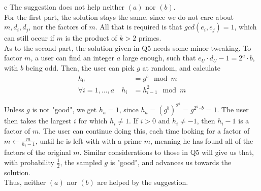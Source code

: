\documentclass{article}
\begin{document}
\begin{paragraph}
    c The suggestion does not help neither \((a)\) nor \((b)\).\\
    
    For the first part, the solution stays the same, since we do not care about \(m, d_i, d_j\), nor the factors of \(m\). All that is required is that \(gcd(e_i, e_j) = 1\), which can still occur if \(m\) is the product of \(k > 2\) primes.\\
    
    As to the second part, the solution given in Q5 needs some minor tweaking. To factor \(m\), a user can find an integer \(a\) large enough, such that \(e_U \cdot d_U - 1 = 2^a \cdot b\), with \(b\) being odd. Then, the user can pick \(g\) at random, and calculate
    \begin{align*}
        h_0 &= g^b \mod{m}\\
        \forall i = 1, ..., a \quad h_i &= h_{i - 1}^2 \mod{m}
    \end{align*}
    
    Unless \(g\) is not "good", we get \(h_a = 1\), since \(h_a = (g^b)^{2^a} = g^{2^a \cdot b} = 1\). The user then takes the largest \(i\) for which \(h_i \neq 1\). If \(i > 0\) and \(h_i \neq -1\), then \(h_i - 1\) is a factor of \(m\). The user can continue doing this, each time looking for a factor of \(m \gets \frac{m}{h_i - 1}\), until he is left with with a prime \(m\), meaning he has found all of the factors of the original \(m\). Similar considerations to those in Q5 will give us that, with probability \(\frac{1}{2}\), the sampled \(g\) is "good", and advances us towards the solution.\\
    
    Thus, neither \((a)\) nor \((b)\) are helped by the suggestion.
\end{paragraph}
\end{document}
